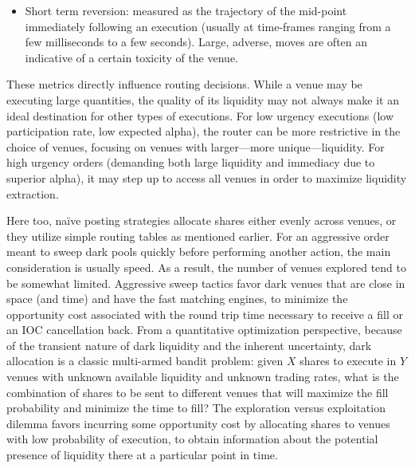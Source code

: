 \begin{itemize}
\begin{itemize}
\item Short term reversion: measured as the trajectory of the mid-point immediately following an execution (usually at time-frames ranging from a few milliseconds to a few seconds). Large, adverse, moves are often an indicative of a certain toxicity of the venue. 
\end{itemize}


These metrics directly influence routing decisions. While a venue may be executing large quantities, the quality of its liquidity may not always make it an ideal destination for other types of executions. For low urgency executions (low participation rate, low expected alpha), the router can be more restrictive in the choice of venues, focusing on venues with larger---more unique---liquidity. For high urgency orders (demanding both large liquidity and immediacy due to superior alpha), it may step up to access all venues in order to maximize liquidity extraction.


Here too, na\"ive posting strategies allocate shares either evenly across venues, or they utilize simple routing tables as mentioned earlier. For an aggressive order meant to sweep dark pools quickly before performing another action, the main consideration is usually speed. As a result, the number of venues explored tend to be somewhat limited. Aggressive sweep tactics favor dark venues that are close in space (and time) and have the fast matching engines, to minimize the opportunity cost associated with the round trip time necessary to receive a fill or an IOC cancellation back. From a quantitative optimization perspective, because of the transient nature of dark liquidity and the inherent uncertainty, dark allocation is a classic multi-armed bandit problem: given $X$ shares to execute in $Y$ venues with unknown available liquidity and unknown trading rates, what is the combination of shares to be sent to different venues that will maximize the fill probability and minimize the time to fill? The exploration versus exploitation dilemma favors incurring some opportunity cost by allocating shares to venues with low probability of execution, to obtain information about the potential presence of liquidity there at a particular point in time.



\end{itemize}
